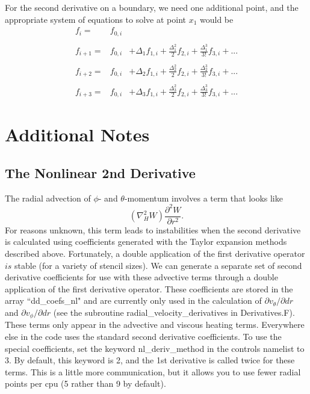 \documentclass[12pt,letterpaper]{article}
\def\dfz{f_{0,i}}
\def\df{f_{1,i}}
\def\ddf{f_{2,i}}
\def\dddf{f_{3,i}}
\def\dpl{\Delta_{1}}
\def\dpp{\Delta_{2}}
\def\dppp{\Delta_{3}}
\begin{document}
For the second derivative on a boundary, we need one additional point, and the appropriate system of equations to solve at point $x_1$ would be
\begin{equation}
\begin{array}{ccc}
 f_{i}  = & \dfz & \\
\\
f_{i+1} = & \dfz & + \dpl\df+\frac{\dpl^2}{2}\ddf+\frac{\dpl^3}{3!}\dddf +...\\
\\
f_{i+2} = & \dfz & + \dpp\df+\frac{\dpp^2}{2}\ddf+\frac{\dpp^3}{3!}\dddf +... \\
\\
f_{i+3} = & \dfz & + \dppp\df+\frac{\dppp^2}{2}\ddf+\frac{\dppp^3}{3!}\dddf +...
\end{array}
\end{equation}


\section{Additional Notes}
\subsection{The Nonlinear 2nd Derivative}
The radial advection of $\phi$- and $\theta$-momentum involves a term that looks like
\begin{equation}
(\nabla^2_H W )\frac{\partial^2 W}{\partial r^2}.
\end{equation}
For reasons unknown, this term leads to instabilities when the second derivative is calculated using coefficients generated with the Taylor expansion methods described above.  Fortunately, a double application of the first derivative operator $is$ stable (for a variety of stencil sizes).  We can generate a separate set of second derivative coefficients for use with these advective terms through a double application of the first derivative operator.  These coefficients are stored in the array ``dd\_coefs\_nl" and are currently only used in the calculation of $\partial v_{\theta}/\partial dr$ and $\partial v_{\phi}/\partial dr$ (see the subroutine radial\_velocity\_derivatives in Derivatives.F).  These terms only appear in the advective and viscous heating terms.  Everywhere else in the code uses the standard second derivative coefficients.  To use the special coefficients, set the keyword nl\_deriv\_method in the controls namelist to 3.  By default, this keyword is 2, and the 1st derivative is called twice for these terms.  This is a little more communication, but it allows you to use fewer radial points per cpu (5 rather than 9 by default).
\end{document}
